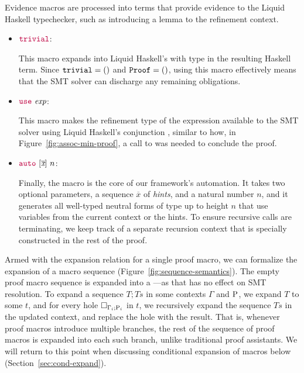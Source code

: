 Evidence macros are processed into terms that provide evidence to the
Liquid Haskell typechecker, such as introducing a lemma to the
refinement context.

\begin{itemize}

\item ${\color{purple}\mathtt{trivial}}$:

  This macro expands into Liquid Haskell's  with type
   in the resulting Haskell term. Since $\mathtt{trivial} =
  \mathtt{()}$ and $\mathtt{Proof} = \mathtt{()}$, using this macro effectively
  means that the SMT solver can discharge any remaining obligations.

\item ${\color{purple}\mathtt{use}} ~ \textit{exp}$:

  This macro makes the refinement type of the expression available to
  the SMT solver using Liquid Haskell's conjunction \LC{&&&}, similar
  to how, in Figure~\ref{fig:assoc-min-proof}, a call to
   was needed to conclude the proof.
  
\item ${\color{purple}\mathtt{auto}} ~ [\overline{\textit{x}}] ~ n$:

  Finally, the  macro is the core of our framework's
  automation.  It takes two optional parameters, a sequence
  $\overline{\textit{x}}$ of {\em hints}, and a natural number $n$,
  and it generates all well-typed neutral forms of type  up
  to height $n$ that use variables from the current context or the
  hints. To ensure recursive calls are terminating, we keep track of a
  separate recursion context that is specially constructed in the rest
  of the proof.
\end{itemize}

Armed with the expansion relation for a single proof macro, we can
formalize the expansion of a macro sequence
(Figure~\ref{fig:sequence-semantics}). The empty proof macro sequence
is expanded into a ---as that has no effect on SMT
resolution. To expand a sequence $T; Ts$ in some contexts $\Gamma$ and
$\mathrm{P}$, we expand $T$ to some \LangBTerm $t$, and for every hole
$\Box_{\Gamma_i ; \mathrm{P}_i}$ in $t$, we recursively expand the
sequence $Ts$ in the updated context, and replace the hole with the
result.  That is, whenever proof macros introduce multiple branches,
the rest of the sequence of proof macros is expanded into each such
branch, unlike traditional proof assistants. We will return to this
point when discussing conditional expansion of macros below
(Section~\ref{sec:cond-expand}).


